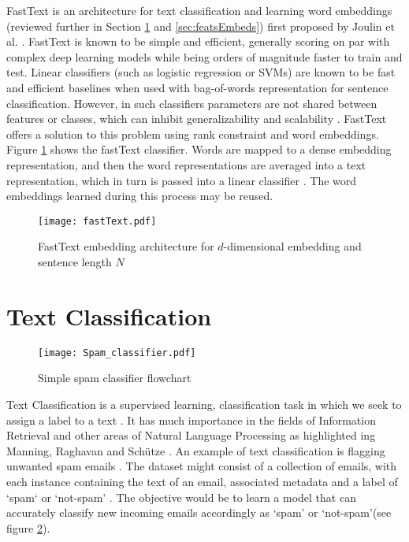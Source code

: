 \documentclass[Dissertation.tex]{subfiles}
\begin{document}
FastText is an architecture for text classification and learning word embeddings (reviewed further in Section \ref{sec:textClass} and \ref{sec:featsEmbeds}) first proposed by Joulin et al. \cite{joulinBagTricksEfficient2016}. FastText is known to be simple and efficient, generally scoring on par with complex deep learning models while being orders of magnitude faster to train and test. Linear classifiers (such as logistic regression or SVMs) are known to be fast and efficient baselines when used with bag-of-words representation for sentence classification. However, in such classifiers parameters are not shared between features or classes, which can inhibit generalizability and scalability \cite{joulinBagTricksEfficient2016}. FastText offers a solution to this problem using rank constraint and word embeddings. Figure \ref{fig:fastTextArch} shows the fastText classifier. Words are mapped to a dense embedding representation, and then the word representations are averaged into a text representation, which in turn is passed into a linear classifier \cite{joulinBagTricksEfficient2016}. The word embeddings learned during this process may be reused. 

\begin{figure}[h]
	\centering
	\texttt{[image: fastText.pdf]}
	\caption{FastText embedding architecture for $ d $-dimensional embedding and sentence length $ N $}
	\label{fig:fastTextArch}
\end{figure}



\section{Text Classification}\label{sec:textClass}


\begin{figure}

	\centering
	\texttt{[image: Spam\_classifier.pdf]}
	\caption{Simple spam classifier flowchart}
	\label{spamClassifier}
\end{figure}
Text Classification is a supervised learning, classification task in which we seek to assign a label to a text \cite{jurafskySpeechLanguageProcessing}. It has much importance in the fields of Information Retrieval and other areas of Natural Language Processing  as highlighted ing Manning, Raghavan and Sch\"{u}tze \cite{manningIntroductionInformationRetrieval2009}.
An example of text classification is flagging unwanted spam emails \cite{geronHandsonMachineLearning2017}. The dataset might consist of a collection of emails, with each instance containing the text of an email, associated metadata and a label of `spam` or `not-spam' \cite{geronHandsonMachineLearning2017}. The objective would be to learn a model that can accurately classify new incoming emails accordingly as `spam' or `not-spam'(see figure \ref{spamClassifier}). 
\end{document}
